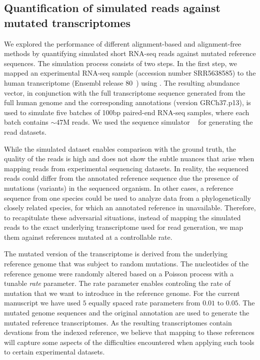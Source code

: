 \subsection{Quantification of simulated reads against mutated transcriptomes}\label{subsec:synthetic}

We explored the performance of different alignment-based and alignment-free methods by quantifying simulated short 
RNA-seq reads against mutated reference sequences. 
The simulation process consists of two steps. In the first step, 
we mapped an experimental RNA-seq sample (accession number SRR5638585) 
to the human transcriptome (Ensembl release 
80~\citep{yates2015ensembl}) using \salmon. The resulting abundance vector, in conjunction with the full 
transcriptome sequence generated from the full human genome and the corresponding annotations (version GRCh37.p13), 
is used to simulate five batches of 100bp paired-end RNA-seq samples, where each batch contains $\sim47$M reads. 
We used the sequence simulator \polyester~\citep{frazee2015polyester} for generating the read datasets.

While the simulated dataset enables comparison with the ground truth, the quality of the reads is high and does 
not show the subtle nuances that arise when mapping reads from experimental sequencing datasets. In reality, the 
sequenced reads could differ from the annotated reference sequence due the presence of mutations (variants) in the 
sequenced organism. In other cases, a reference sequence from one species could be used to analyze data from a 
phylogenetically closely related species, for which an annotated reference in unavailable. Therefore, to 
recapitulate these adversarial situations, instead of mapping the simulated reads to the exact underlying 
transcriptome used for read generation, we map them against references mutated at a controllable rate.

The mutated version of the transcriptome is derived from the underlying reference genome that was subject to 
random mutations. The nucleotides of the reference genome were randomly altered based on a Poisson process with 
a tunable {\it rate} parameter. The rate parameter enables controling the rate of mutation that we want to 
introduce in the reference genome. For the current manuscript we have used $5$ equally spaced rate parameters 
from $0.01$ to $0.05$. The mutated genome sequences and the original annotation are used to generate the mutated 
reference transcriptomes. As the resulting transcriptomes contain devations from the indexed reference, we believe 
that mapping to these references will capture some aspects of the difficulties encountered when applying such tools 
to certain experimental datasets.

